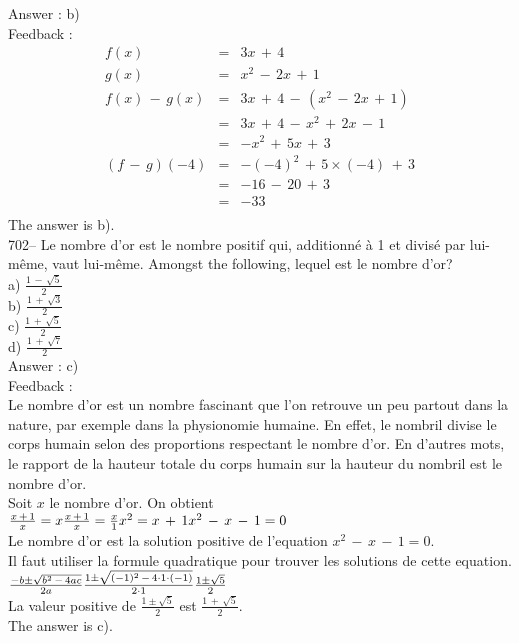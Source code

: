 ﻿\documentclass[letterpaper, 12pt]{article}
\begin{document}
Answer : b)\\

Feedback : \\
\begin{eqnarray*}
f(x)&=&3x\,+\,4\\
g(x)&=&x^{2}\,-\,2x\,+\,1\\
f(x)\,-\,g(x)&=&3x\,+\,4\,-\,(x^{2}\,-\,2x\,+\,1)\\
&=&3x\,+\,4\,-\,x^{2}\,+\,2x\,-\,1\\
&=&-x^{2}\,+\,5x\,+\,3\\
(f\,-\,g)(-4)&=& - (-4)^{2}\,+\,5\times(-4)\,+\,3\\
&=&-16\,-\,20\,+\,3\\
&=&-33\\
\end{eqnarray*}
The answer is b).\\

702-- Le nombre d'or est le nombre positif qui, additionn\'e \`a 1 et
divis\'e par lui-m\^eme, vaut lui-m\^eme.  Amongst the following,
lequel est le nombre d'or?\\
a) $\frac{1\,-\,\sqrt{5}}{2}$\\
b) $\frac{1\,+\,\sqrt{3}}{2}$\\
c) $\frac{1\,+\,\sqrt{5}}{2}$\\
d) $\frac{1\,+\,\sqrt{7}}{2}$\\

Answer : c)\\

Feedback : \\
Le nombre d'or est un nombre fascinant que l'on retrouve un peu partout dans
la nature, par exemple dans la physionomie humaine. En effet, le nombril
divise le corps humain selon des proportions respectant le nombre d'or.  En
d'autres mots, le rapport de la hauteur totale du corps humain sur la
hauteur du nombril est le nombre d'or.\\
Soit $x$ le nombre d'or.  On obtient\\[2mm]
$\frac{x\,+\,1}{x}=x\\[2mm]
\frac{x\,+\,1}{x}=\frac{x}{1}\\[2mm]
x^{2}=x\,+\,1\\[2mm]
x^{2}\,-\,x\,-\,1=0$\\[2mm]
Le nombre d'or est la solution positive de l'equation
$x^{2}\,-\,x\,-\,1=0$.\\
Il faut utiliser la formule quadratique pour trouver les solutions de cette
equation.\\[2mm]
$\frac{-b\pm\sqrt{b^{2}\,-\,4ac}}{2a}\\[2mm]
\frac{1\pm\sqrt{(-1)^{2}\,-\,4\cdot1\cdot(-1)}}{2\cdot1}\\[2mm]
\frac{1\pm\sqrt{5}}{2}$\\[2mm]
La valeur positive de $\frac{1\pm\sqrt{5}}{2}$ est
$\frac{1\,+\,\sqrt{5}}{2}$.\\[2mm]
The answer is c).\\
\end{document}
